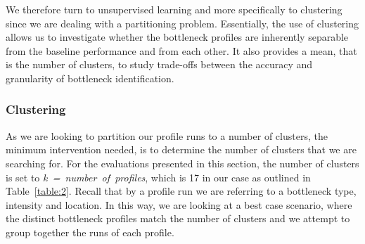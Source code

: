 \documentclass[journal,comsoc]{IEEEtran}
\begin{document}
We therefore turn to unsupervised learning and more specifically to clustering since we are dealing with a partitioning problem.
Essentially, the use of clustering allows us to investigate whether the bottleneck profiles are inherently separable from the baseline performance and from each other.
It also provides a mean, that is the number of clusters, to study trade-offs between the accuracy and granularity of bottleneck identification. 

\subsubsection{Clustering}
\label{sec:clustering}

% 
As we are looking to partition our profile runs to a number of clusters, the minimum intervention needed, is to determine the number of clusters that we are searching for.
For the evaluations presented in this section, the number of clusters is set to \textit{k~=~number~of~profiles}, which is 17 in our case as outlined in Table~\ref{table:2}.
Recall that by a profile run we are referring to a bottleneck type, intensity and location. 
In this way, we are looking at a best case scenario, where the distinct bottleneck profiles match the number of clusters and we attempt to group together the runs of each profile.
\end{document}
